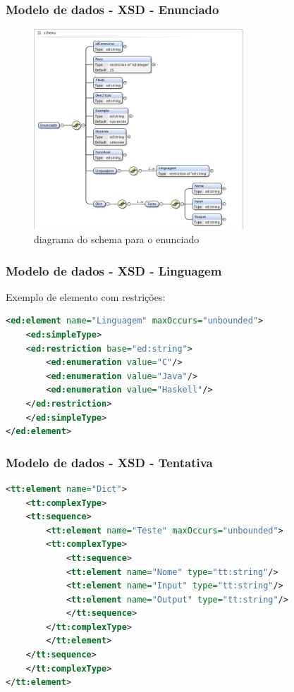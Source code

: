 \documentclass{beamer}
\begin{document}
\begin{frame}[fragile] \frametitle{Modelo de dados - XSD - Enunciado}
\begin{figure}[htbp]
\begin{center}
\includegraphics[width=0.7\textwidth]{../report1/Images/enunciado_schema}
\caption{diagrama do schema para o enunciado}\label{fig xsd enunciado}
\end{center}
\end{figure}
\end{frame}

\begin{frame}[fragile] \frametitle{Modelo de dados - XSD - Linguagem}
Exemplo de elemento com restrições:\\
\begin{lstlisting}[language=XML,basicstyle=\tiny,breaklines=true]
<ed:element name="Linguagem" maxOccurs="unbounded">
    <ed:simpleType>
    <ed:restriction base="ed:string">
        <ed:enumeration value="C"/>
        <ed:enumeration value="Java"/>
        <ed:enumeration value="Haskell"/>
    </ed:restriction>
    </ed:simpleType>
</ed:element>
\end{lstlisting}
\end{frame}

\begin{frame}[fragile] \frametitle{Modelo de dados - XSD - Tentativa}
\begin{lstlisting}[language=XML,basicstyle=\tiny,breaklines=true]
<tt:element name="Dict">
    <tt:complexType>
    <tt:sequence>
        <tt:element name="Teste" maxOccurs="unbounded">
        <tt:complexType>
            <tt:sequence>
            <tt:element name="Nome" type="tt:string"/>
            <tt:element name="Input" type="tt:string"/>
            <tt:element name="Output" type="tt:string"/>
            </tt:sequence>
        </tt:complexType>
        </tt:element>
    </tt:sequence>
    </tt:complexType>
</tt:element>
\end{lstlisting}
\end{frame}
\end{document}

